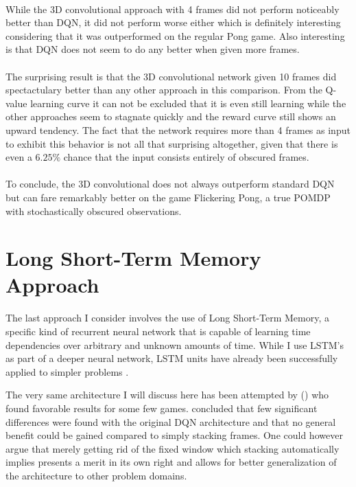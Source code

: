 \paragraph{}
While the 3D convolutional approach with 4 frames did not perform noticeably
better than DQN,
it did not perform worse either
which is definitely interesting considering
that it was outperformed on the regular Pong game.
Also interesting is that DQN does not seem to do any better when given more frames.

\paragraph{}
The surprising result is that the 3D convolutional network given 10 frames
did spectactulary better than any other approach in this comparison.
From the Q-value learning curve it can not be excluded that it is
even still learning while the other approaches seem to stagnate quickly
and the reward curve still shows an upward tendency.
The fact that the network requires more than 4 frames as input
to exhibit this behavior is not all that surprising altogether,
given that there is even a $6.25\%$ chance
that the input consists entirely of obscured frames.

\paragraph{}
To conclude,
the 3D convolutional does not always outperform standard DQN
but can fare remarkably better
on the game Flickering Pong,
a true POMDP with stochastically obscured observations.

\section{Long Short-Term Memory Approach}
\label{sec:long_short_term_memory_approach}
The last approach I consider involves
the use of Long Short-Term Memory,
a specific kind of recurrent neural network
that is capable of learning time dependencies
over arbitrary and unknown amounts of time.
While I use LSTM's
as part of a deeper neural network,
LSTM units have already been successfully applied
to simpler problems
\parencite{Bakker2001}.

The very same architecture I will discuss here
has been attempted by
\citeauthor{Hausknecht2015} (\citeyear{Hausknecht2015})
who found favorable results for some few games.
\citeauthor{Hausknecht2015}
concluded that few significant differences
were found with the original DQN architecture
and that no general benefit could be gained compared
to simply stacking frames.
One could however argue
that merely getting rid of the fixed window
which stacking automatically implies
presents a merit in its own right
and allows for better generalization of the architecture
to other problem domains.

